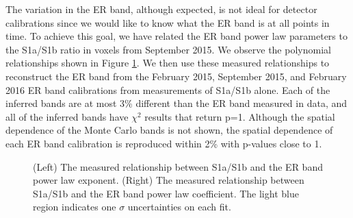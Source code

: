 \documentclass[a4paper,12pt]{article}
\begin{document}
{The variation in the ER band, although expected, is not ideal for detector calibrations since we would like to know what the ER band is at all points in time.  To achieve this goal, we have related the ER band power law parameters to the S1a/S1b ratio in voxels from September 2015.  We observe the polynomial relationships shown in Figure \ref{ERBand_S1aS1bToER}.  We then use these measured relationships to reconstruct the ER band from the February 2015, September 2015, and February 2016 ER band calibrations from measurements of S1a/S1b alone. Each of the inferred bands are at most 3\% different than the ER band measured in data, and all of the inferred bands have $\chi^2$ results that return p=1.  Although the spatial dependence of the Monte Carlo bands is not shown, the spatial dependence of each ER band calibration is reproduced within 2\% with p-values close to 1. %

\begin{figure} 
\centering
{}
\qquad
{}
\caption{ (Left) The measured relationship between S1a/S1b and the ER band power law exponent. (Right) The measured relationship between S1a/S1b and the ER band power law coefficient. The light blue region indicates one $\sigma$ uncertainties on each fit.}
\label{ERBand_S1aS1bToER}
\end{figure}

}
\end{document}
